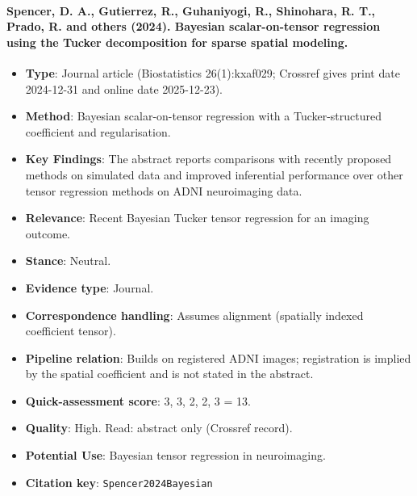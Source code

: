 \documentclass[journal,onecolumn]{IEEEtran}
\begin{document}
\paragraph{Spencer, D. A., Gutierrez, R., Guhaniyogi, R., Shinohara, R. T., Prado, R. and others (2024). Bayesian scalar-on-tensor regression using the Tucker decomposition for sparse spatial modeling.~\cite{Spencer2024Bayesian}}\mbox{}

\begin{itemize}

\item{} \textbf{Type}: Journal article (Biostatistics 26(1):kxaf029; Crossref gives print date 2024-12-31 and online date 2025-12-23).

\item{} \textbf{Method}: Bayesian scalar-on-tensor regression with a Tucker-structured coefficient and regularisation.

\item{} \textbf{Key Findings}: The abstract reports comparisons with recently proposed methods on simulated data and improved inferential performance over other tensor regression methods on ADNI neuroimaging data.

\item{} \textbf{Relevance}: Recent Bayesian Tucker tensor regression for an imaging outcome.

\item{} \textbf{Stance}: Neutral.

\item{} \textbf{Evidence type}: Journal.

\item{} \textbf{Correspondence handling}: Assumes alignment (spatially indexed coefficient tensor).

\item{} \textbf{Pipeline relation}: Builds on registered ADNI images; registration is implied by the spatial coefficient and is not stated in the abstract.

\item{} \textbf{Quick-assessment score}: 3, 3, 2, 2, 3 = 13.

\item{} \textbf{Quality}: High. Read: abstract only (Crossref record).

\item{} \textbf{Potential Use}: Bayesian tensor regression in neuroimaging.

\item{} \textbf{Citation key}: \texttt{Spencer2024Bayesian}

\end{itemize}
\end{document}
